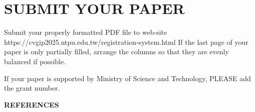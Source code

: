 \documentclass[10pt,twocolumn]{article}
\begin{document}
\section{SUBMIT YOUR PAPER}
Submit your properly formatted PDF file to web-site 
https://cvgip2025.ntpu.edu.tw/registration-system.html
If the last page of your paper is only partially filled, arrange the columns so that they are evenly balanced if possible.





If your paper is supported by Ministry of Science and Technology, PLEASE add the grant number.




\begin{center}
\textbf{REFERENCES}
\end{center}
\vspace{-3.25em}  %


\end{document}
